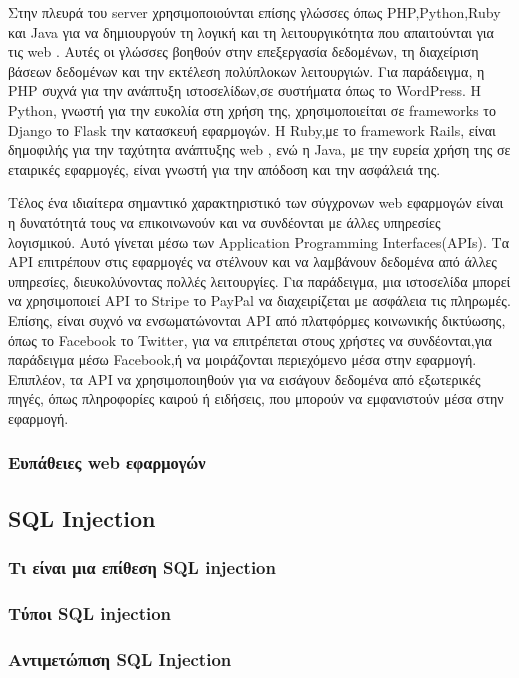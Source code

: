Στην πλευρά του server χρησιμοποιούνται επίσης γλώσσες όπως \lt PHP,Python,Ruby \gt και \lt Java \gt  για να δημιουργούν τη λογική και τη λειτουργικότητα που απαιτούνται για τις \lt web . Αυτές οι γλώσσες βοηθούν στην επεξεργασία δεδομένων, τη διαχείριση βάσεων δεδομένων και την εκτέλεση πολύπλοκων λειτουργιών. Για παράδειγμα, η \lt PHP  συχνά για την ανάπτυξη ιστοσελίδων,σε συστήματα όπως το \lt WordPress\gt. Η \lt Python\gt, γνωστή για την ευκολία στη χρήση της, χρησιμοποιείται σε \lt frameworks  το \lt Django  το \lt Flask  την κατασκευή εφαρμογών. Η \lt Ruby,\gt με το \lt framework Rails\gt, είναι δημοφιλής για την ταχύτητα ανάπτυξης \lt web , ενώ η \lt Java\gt, με την ευρεία χρήση της σε εταιρικές εφαρμογές, είναι γνωστή για την απόδοση και την ασφάλειά της.

Τέλος ένα ιδιαίτερα σημαντικό χαρακτηριστικό των σύγχρονων \lt web \gt εφαρμογών είναι η δυνατότητά τους να επικοινωνούν και να συνδέονται με άλλες υπηρεσίες λογισμικού. Αυτό γίνεται μέσω των \lt Application Programming Interfaces(APIs)\gt. Τα \lt API \gt επιτρέπουν στις εφαρμογές να στέλνουν και να λαμβάνουν δεδομένα από άλλες υπηρεσίες, διευκολύνοντας πολλές λειτουργίες. Για παράδειγμα, μια ιστοσελίδα μπορεί να χρησιμοποιεί \lt API  το \lt Stripe  το \lt PayPal  να διαχειρίζεται με ασφάλεια τις πληρωμές. Επίσης, είναι συχνό να ενσωματώνονται API από πλατφόρμες κοινωνικής δικτύωσης, όπως το \lt Facebook  το \lt Twitter\gt, για να επιτρέπεται στους χρήστες να συνδέονται,για παράδειγμα μέσω \lt Facebook,\gt ή να μοιράζονται περιεχόμενο μέσα στην εφαρμογή. Επιπλέον, τα \lt API  να χρησιμοποιηθούν για να εισάγουν δεδομένα από εξωτερικές πηγές, όπως πληροφορίες καιρού ή ειδήσεις, που μπορούν να εμφανιστούν μέσα στην εφαρμογή.
\subsubsection{Ευπάθειες \lt web \gt εφαρμογών}

\subsection{\lt SQL Injection}
\subsubsection{Τι είναι μια επίθεση \lt SQL injection}
\subsubsection{Τύποι \lt SQL injection}
\subsubsection{Αντιμετώπιση \lt SQL Injection}
